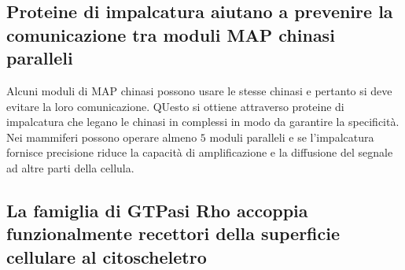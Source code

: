 \subsection{Proteine di impalcatura aiutano a prevenire la comunicazione tra moduli MAP chinasi paralleli}
Alcuni moduli di MAP chinasi possono usare le stesse chinasi e pertanto si deve evitare la loro comunicazione. QUesto si ottiene attraverso proteine di impalcatura che legano le 
chinasi in complessi in modo da garantire la specificit\`a. Nei mammiferi possono operare almeno $5$ moduli paralleli e se l'impalcatura fornisce precisione riduce la capacit\`a 
di amplificazione e la diffusione del segnale ad altre parti della cellula. 
\subsection{La famiglia di GTPasi Rho accoppia funzionalmente recettori della superficie cellulare al citoscheletro}

